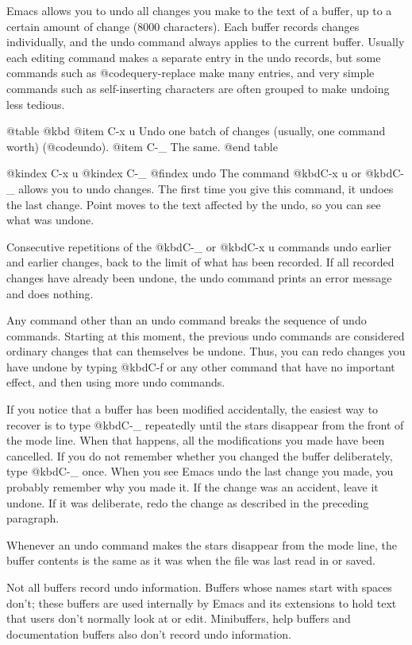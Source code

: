 {{  Emacs allows you to undo all changes you make to the text of a buffer,
up to a certain amount of change (8000 characters).  Each buffer records
changes individually, and the undo command always applies to the
current buffer.  Usually each editing command makes a separate entry
in the undo records, but some commands such as @code{query-replace}
make many entries, and very simple commands such as self-inserting
characters are often grouped to make undoing less tedious.

@table @kbd
@item C-x u
Undo one batch of changes (usually, one command worth) (@code{undo}).
@item C-_
The same.
@end table

@kindex C-x u
@kindex C-_
@findex undo
  The command @kbd{C-x u} or @kbd{C-_} allows you to undo changes.  The
first time you give this command, it undoes the last change.  Point
moves to the text affected by the undo, so you can see what was undone.

  Consecutive repetitions of the @kbd{C-_} or @kbd{C-x u} commands undo
earlier and earlier changes, back to the limit of what has been
recorded.  If all recorded changes have already been undone, the undo
command prints an error message and does nothing.

  Any command other than an undo command breaks the sequence of undo
commands.  Starting at this moment, the previous undo commands are
considered ordinary changes that can themselves be undone.  Thus, you can
redo changes you have undone by typing @kbd{C-f} or any other command
that have no important effect, and then using more undo commands.

  If you notice that a buffer has been modified accidentally, the
easiest way to recover is to type @kbd{C-_} repeatedly until the stars
disappear from the front of the mode line.  When that happens, all the
modifications you made have been cancelled.  If you do not remember
whether you changed the buffer deliberately, type @kbd{C-_} once. When
you see Emacs undo the last change you made, you probably remember why you
made it.  If the change was an accident, leave it undone.  If it was
deliberate, redo the change as described in the preceding paragraph.

  Whenever an undo command makes the stars disappear from the mode line,
the buffer contents is the same as it was when the file was last read in
or saved.

  Not all buffers record undo information.  Buffers whose names start with
spaces don't; these buffers are used internally by Emacs and its extensions
to hold text that users don't normally look at or edit.  Minibuffers,
help buffers and documentation buffers also don't record undo information.

}}
